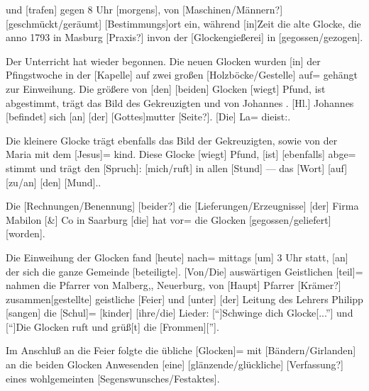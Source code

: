 

und {[trafen]} gegen 8 Uhr {[morgens]}, von [Maschinen/Männern?]\ob
\unsicher\unsicher{} [geschmückt/geräumt]\unsicher{}\unsicher\unsicher{} {[Bestimmungs]}ort\ob
ein, während {[in]}\unsicher{}\unsicher Zeit die alte Glocke, die\ob
anno 1793 in Masburg\unsicher{}\unsicher {[der]} [Praxis?]\unsicher{}\unsicher{}\unsicher{}\unsicher\unsicher{} in\unsicher{}\unsicher von der {[Glockengießerei]}\unsicher{} in\ob
\unsicher\unsicher{} [gegossen/gezogen]\unsicher{}\unsicher [Abholung?] [fertig?] {[war]}.

%
Der Unterricht hat wieder begonnen.\ob
Die neuen Glocken wurden {[in]} der Pfingstwoche\ob
in der {[Kapelle]} auf zwei großen [Holzböcke/Gestelle] auf=\ob
gehängt zur Einweihung. Die größere von {[den]} {[beiden]}\ob
{}%
Glocken {[wiegt]}\unsicher{} Pfund, ist\unsicher{} abgestimmt, trägt\ob
das Bild des Gekreuzigten und von Johannes\ob
{}\unsicher. [Hl.] Johannes\ob
{[befindet]} sich {[an]} {[der]} {[Gottes]}mutter [Seite?]\unsicher. {[Die]} La=\ob
\unsicher\unsicher{}\unsicher die\unsicher{}\unsicher ist:\unsicher{}\unsicher\unsicher.

Die kleinere Glocke trägt ebenfalls das Bild\ob
der Gekreuzigten, sowie von der Maria mit dem {[Jesus]}=\ob
kind. Diese Glocke {[wiegt]}\unsicher{} Pfund, {[ist]} {[ebenfalls]} abge=\ob
stimmt und trägt den {[Spruch]}:\unsicher{} [mich/ruft]\unsicher{} in allen\ob
{[Stund]} — das {[Wort]} {[auf]}\unsicher{} [zu/an] {[den]}\unsicher{} {[Mund]}.\unsicher{}\unsicher\unsicher.

Die [Rechnungen/Benennung] [beider?]\unsicher{} die [Lieferungen/Erzeugnisse] {[der]}\ob
Firma Mabilon [\&] Co in Saarburg\unsicher{} {[die]} hat vor=\ob
\unsicher die Glocken [gegossen/geliefert] {[worden]}.

Die Einweihung der Glocken fand {[heute]} nach=\ob
mittags {[um]} 3 Uhr statt, {[an]} der sich die ganze Gemeinde\ob
{[beteiligte]}. [Von/Die] auswärtigen Geistlichen\unsicher{} {[teil]}=\ob
nahmen\unsicher{} die Pfarrer von Malberg,\unsicher, Neuerburg,\ob
\unsicher von\unsicher{} {[Haupt]} Pfarrer [Krämer?]\unsicher\ob
\unsicher {[eine]} zusammen{[gestellte]} geistliche\unsicher{} {[Feier]}\unsicher{} und\ob
{[unter]} {[der]} Leitung des Lehrers Philipp {[sangen]} die {[Schul]}=\ob
{[kinder]} [ihre/die] Lieder: [\enquote{]Schwinge dich Glocke[...}]\ob
und [\enquote{]Die Glocken\unsicher{} ruft und grüß{[t]} die {[Frommen]}[}].

Im Anschluß an die Feier folgte die übliche {[Glocken]}=\ob
\unsicher [Schlag?] mit [Bändern/Girlanden] an die beiden Glocken\ob
{} Anwesenden {[eine]} [glänzende/glückliche]\unsicher{} [Verfassung?]\ob
\unsicher eines wohlgemeinten [Segenswunsches/Festaktes].
\pend
